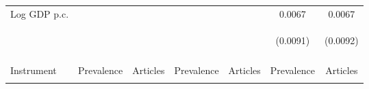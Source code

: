 \documentclass{article}
\begin{document}
\begin{table}[htbp]
{\begin{tabular}{lcccccc}
Log GDP p.c. &  &  & &  & 0.0067 & 0.0067 \\
 & \begin{footnotesize} \end{footnotesize} & \begin{footnotesize} \end{footnotesize} & \begin{footnotesize} \end{footnotesize} & \begin{footnotesize} \end{footnotesize} & \begin{footnotesize}(0.0091)\end{footnotesize} & \begin{footnotesize}(0.0092)\end{footnotesize} \\
\vspace{4pt} & \begin{footnotesize}\end{footnotesize} & \begin{footnotesize}\end{footnotesize} & \begin{footnotesize}\end{footnotesize} & \begin{footnotesize}\end{footnotesize} & \begin{footnotesize}\end{footnotesize} & \begin{footnotesize}\end{footnotesize} \\
Instrument & Prevalence & Articles & Prevalence & Articles & Prevalence & Articles \\
\vspace{4pt} & \begin{footnotesize}\end{footnotesize} & \begin{footnotesize}\end{footnotesize} & \begin{footnotesize}\end{footnotesize} & \begin{footnotesize}\end{footnotesize} & \begin{footnotesize}\end{footnotesize} & \begin{footnotesize}\end{footnotesize} \\

\end{tabular}}
\end{table}
\end{document}
